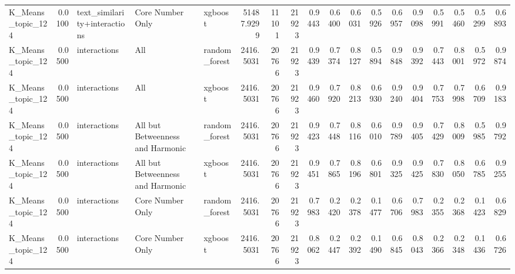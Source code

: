 \begin{tabular}{lrlllrrrrrrrrrrrrr}
K_Means_topic_124 & 0.0100 & text_similarity+interactions & Core Number Only & xgboost & 51487.9299 & 11101 & 21923 & 0.9443 & 0.6400 & 0.6031 & 0.5926 & 0.6957 & 0.9098 & 0.5991 & 0.5460 & 0.5299 & 0.6893 \\
K_Means_topic_124 & 0.0500 & interactions & All & random_forest & 2416.5031 & 20766 & 21923 & 0.9439 & 0.7374 & 0.8127 & 0.5894 & 0.9848 & 0.9392 & 0.7443 & 0.8001 & 0.5972 & 0.9874 \\
K_Means_topic_124 & 0.0500 & interactions & All & xgboost & 2416.5031 & 20766 & 21923 & 0.9460 & 0.7920 & 0.8213 & 0.6930 & 0.9240 & 0.9404 & 0.7753 & 0.7998 & 0.6709 & 0.9183 \\
K_Means_topic_124 & 0.0500 & interactions & All but Betweenness and Harmonic & random_forest & 2416.5031 & 20766 & 21923 & 0.9423 & 0.7448 & 0.8116 & 0.6010 & 0.9789 & 0.9405 & 0.7429 & 0.8009 & 0.5985 & 0.9792 \\
K_Means_topic_124 & 0.0500 & interactions & All but Betweenness and Harmonic & xgboost & 2416.5031 & 20766 & 21923 & 0.9451 & 0.7865 & 0.8196 & 0.6801 & 0.9325 & 0.9425 & 0.7830 & 0.8050 & 0.6785 & 0.9255 \\
K_Means_topic_124 & 0.0500 & interactions & Core Number Only & random_forest & 2416.5031 & 20766 & 21923 & 0.7983 & 0.2420 & 0.2378 & 0.1477 & 0.6706 & 0.7983 & 0.2355 & 0.2368 & 0.1423 & 0.6829 \\
K_Means_topic_124 & 0.0500 & interactions & Core Number Only & xgboost & 2416.5031 & 20766 & 21923 & 0.8062 & 0.2447 & 0.2392 & 0.1490 & 0.6845 & 0.8043 & 0.2366 & 0.2348 & 0.1436 & 0.6726 \\
\bottomrule
\end{tabular}
